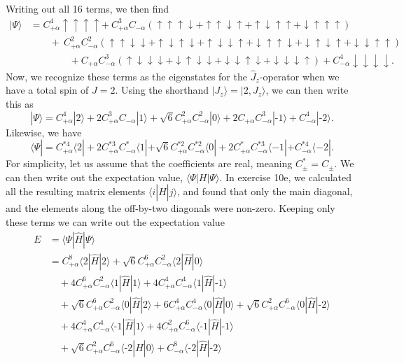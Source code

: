 \documentclass[a4paper, 11pt, notitlepage, english]{article}
\newcommand{\bra}[1]{\langle #1|}
\newcommand{\ket}[1]{|#1 \rangle}
\newcommand{\op}[1]{\hat{#1}}
\newcommand{\braopket}[3]{\langle #1 | {#2} | #3 \rangle}
\renewcommand{\d}{{\rm d}}
\renewcommand{\u}{\uparrow}
\renewcommand{\d}{\downarrow}
\newcommand{\dddd}{\d\d\d\d}
\newcommand{\uddd}{\u\d\d\d}
\newcommand{\dudd}{\d\u\d\d}
\newcommand{\ddud}{\d\d\u\d}
\newcommand{\dddu}{\d\d\d\u}
\newcommand{\uudd}{\u\u\d\d}
\newcommand{\udud}{\u\d\u\d}
\newcommand{\uddu}{\u\d\d\u}
\newcommand{\duud}{\d\u\u\d}
\newcommand{\dudu}{\d\u\d\u}
\newcommand{\dduu}{\d\d\u\u}
\newcommand{\uuud}{\u\u\u\d}
\newcommand{\uudu}{\u\u\d\u}
\newcommand{\uduu}{\u\d\u\u}
\newcommand{\duuu}{\d\u\u\u}
\newcommand{\uuuu}{\u\u\u\u}
\newcommand{\m}{\text{-}}
\begin{document}
\newpage

Writing out all 16 terms, we then find
\begin{align*}
\ket{\Psi} &= C_{+\alpha}^4 \uuuu + \ C_{+\alpha}^3 C_{-\alpha}(\uuud + \uudu + \uduu + \duuu) \\ &\qquad+ \ C_{+\alpha}^2 C_{-\alpha}^2(\uudd + \udud + \uddu + \duud + \dudu + \dduu) \\
&\qquad\qquad + C_{+\alpha} C_{-\alpha}^3 (\uddd + \dudd + \ddud + \dddu) + C_{-\alpha}^4\dddd.
\end{align*}
Now, we recognize these terms as the eigenstates for the $\op{J}_z$-operator when we have a total spin of $J=2$. Using the shorthand $\ket{J_z} = \ket{2,J_z}$, we can then write this as
$$\ket{\Psi} = C_{+\alpha}^4 \ket{2} + 2C_{+\alpha}^3 C_{-\alpha}\ket{1} + \sqrt{6}C_{+\alpha}^2 C_{-\alpha}^2 \ket{0} + 2C_{+\alpha} C_{-\alpha}^3 \ket{\m 1} + C_{-\alpha}^4\ket{\m 2}.$$
Likewise, we have
$$\bra{\Psi} = C_{+\alpha}^{*4} \bra{2} + 2C_{+\alpha}^{*3} C_{-\alpha}^*\bra{1} + \sqrt{6}C_{+\alpha}^{*2} C_{-\alpha}^{*2} \bra{0} + 2C_{+\alpha}^* C_{-\alpha}^{*3} \bra{-1} + C_{-\alpha}^{*4}\bra{-2}.$$
For simplicity, let us assume that the coefficients are real, meaning $C_\pm^* = C_\pm$. We can then write out the expectation value, $\braopket{\Psi}{H}{\Psi}$. In exercise 10e, we calculated all the resulting matrix elements $\braopket{i}{\op{H}}{j}$, and found that only the main diagonal, and the elements along the off-by-two diagonals were non-zero. Keeping only these terms we can write out the expectation value
\begin{align*}
E &= \braopket{\Psi}{\op{H}}{\Psi} \\
&= C_{+\alpha}^{8}                \braopket{2}{\op{H}}{ 2} 
+ \sqrt{6}C_{+\alpha}^{6}C_{-\alpha}^{2} \braopket{2}{\op{H}}{ 0} \\
%
&\quad+ 4C_{+\alpha}^{6}C_{-\alpha}^{2} \braopket{1}{\op{H}}{ 1} 
+ 4C_{+\alpha}^{4}C_{-\alpha}^{4} \braopket{1}{\op{H}}{\m 1} \\ 
%
&\quad+ \sqrt{6}C_{+\alpha}^{6}C_{-\alpha}^{2} \braopket{0}{\op{H}}{ 2} 
+ 6C_{+\alpha}^{4}C_{-\alpha}^{4} \braopket{0}{\op{H}}{ 0} 
+ \sqrt{6}C_{+\alpha}^{2}C_{-\alpha}^{6} \braopket{0}{\op{H}}{\m 2} \\
%
&\quad+ 4C_{+\alpha}^{4}C_{-\alpha}^{4} \braopket{\m 1}{\op{H}}{1} 
+ 4C_{+\alpha}^{2}C_{-\alpha}^{6} \braopket{\m 1}{\op{H}}{\m 1} \\ 
%
&\quad+ \sqrt{6}C_{+\alpha}^{2}C_{-\alpha}^{6} \braopket{\m 2}{\op{H}}{ 0} 
+ C_{-\alpha}^{8}                \braopket{\m 2}{\op{H}}{\m 2}
\end{align*}
\end{document}
